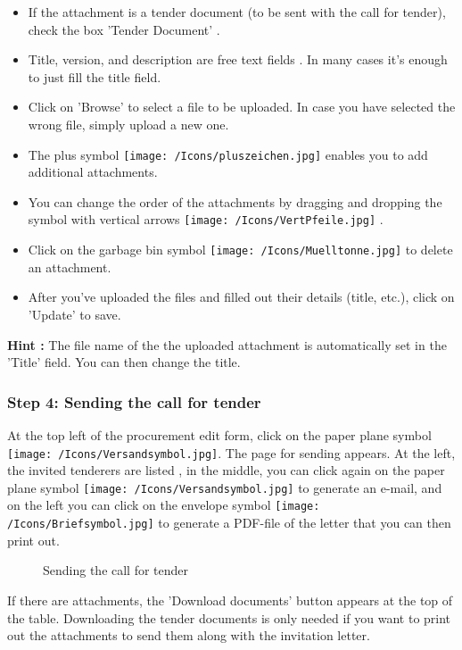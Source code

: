\begin{itemize}
\item If the attachment is a tender document (to be sent with the call for tender), check the box 'Tender Document' .
\item Title, version, and description are free text fields . In many cases it's enough to just fill the title field.
\item Click on 'Browse'  to select a file to be uploaded. In case
you have selected the wrong file, simply upload a new one.
\item The plus symbol \texttt{[image: /Icons/pluszeichen.jpg]}  enables you to add additional attachments.
\item You can change the order of the attachments by dragging and dropping the symbol with vertical arrows \texttt{[image: /Icons/VertPfeile.jpg]} .
\item Click on the garbage bin symbol \texttt{[image: /Icons/Muelltonne.jpg]}  to delete an attachment.
\item After you've uploaded the files and filled out their details (title, etc.), click on 'Update'  to save.
\end{itemize}

\textbf{Hint :} The file name of the the uploaded attachment is automatically set in the 'Title' field. You can then change the title.

\subsubsection{Step 4: Sending the call for tender}

At the top left of the procurement edit form, click on the paper plane symbol \texttt{[image: /Icons/Versandsymbol.jpg]}. The page for sending appears. At the left, the invited tenderers are listed , in the middle, you can click again on the paper plane symbol \texttt{[image: /Icons/Versandsymbol.jpg]}  to generate an e-mail, and on the left you can click on the envelope symbol \texttt{[image: /Icons/Briefsymbol.jpg]}  to generate a PDF-file of the letter that you can then print out.

\begin{figure}[H]
\caption{Sending the call for tender}
\end{figure}

If there are attachments, the 'Download documents' button  appears at the top of the table. Downloading the tender documents is only needed if you want to print out the attachments to send them along with the invitation letter.

